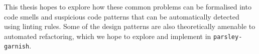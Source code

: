 \documentclass[../../main.tex]{subfiles}
\begin{document}
This thesis hopes to explore how these common problems can be formalised into code smells and suspicious code patterns that can be automatically detected using linting rules.
Some of the design patterns are also theoretically amenable to automated refactoring, which we hope to explore and implement in \texttt{parsley-garnish}.

\end{document}
